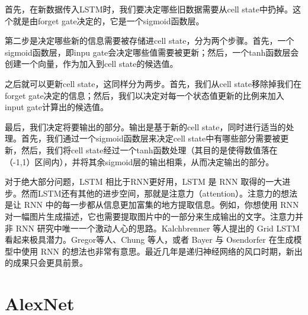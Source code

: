 \documentclass{progbookcn}
\begin{document}
首先，在新数据传入LSTM时，我们要决定哪些旧数据需要从cell state中扔掉。这个就是由forget gate决定的，它是一个sigmoid函数层。

​第二步是决定哪些新的信息需要被存储进cell state，分为两个步骤。首先，一个sigmoid函数层，即inpu gate会决定哪些值需要被更新；然后，一个tanh函数层会创建一个向量，作为加入到cell state的候选值。

​之后就可以更新cell state，这同样分为两步。首先，我们从cell state移除掉我们在forget gate决定的信息；然后，我们以决定对每一个状态值更新的比例来加入input gate计算出的候选值。

最后，我们决定将要输出的部分。输出是基于新的cell state，同时进行适当的处理。首先，我们通过一个sigmoid函数层来决定cell state中有哪些部分需要被更新，然后，我们将cell state经过一个tanh函数处理（其目的是使得数值落在（-1,1）区间内），并将其余sigmoid层的输出相乘，从而决定输出的部分。

​对于绝大部分问题，LSTM 相比于RNN更好用，LSTM 是 RNN 取得的一大进步。然而LSTM还有其他的进步空间，那就是注意力（attention）。注意力的想法是让 RNN 中的每一步都从信息更加富集的地方提取信息。例如，你想使用 RNN 对一幅图片生成描述，它也需要提取图片中的一部分来生成输出的文字。注意力并非 RNN 研究中唯一一个激动人心的思路。Kalchbrenner 等人提出的 Grid LSTM 看起来极具潜力。Gregor等人、Chung 等人，或者 Bayer 与 Osendorfer 在生成模型中使用 RNN 的想法也非常有意思。最近几年是递归神经网络的风口时期，新出的成果只会更具前景。

\section{AlexNet}
\end{document}
